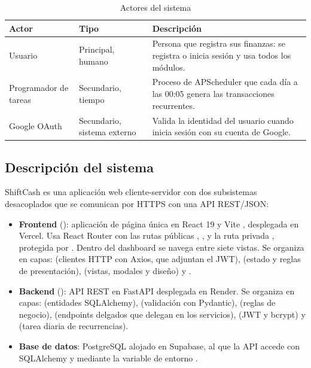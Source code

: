 \begin{table}[H]
\caption{Actores del sistema}
\label{tab:actores}
\begin{tabularx}{\linewidth}{L{3.6cm} L{2.2cm} Y}
\toprule
Actor & Tipo & Descripción \\
\midrule
Usuario & Principal, humano & Persona que registra sus finanzas: se registra o inicia sesión y usa todos los módulos. \\
Programador de tareas & Secundario, tiempo & Proceso de APScheduler que cada día a las 00:05 genera las transacciones recurrentes. \\
Google OAuth & Secundario, sistema externo & Valida la identidad del usuario cuando inicia sesión con su cuenta de Google. \\
\bottomrule
\end{tabularx}
\end{table}

\subsection{Descripción del sistema}\label{sec:descripcion}

ShiftCash es una aplicación web cliente-servidor con dos subsistemas desacoplados que se comunican por HTTPS con una API REST/JSON:

\begin{itemize}
  \item \textbf{Frontend} (): aplicación de página única en React 19 y Vite \parencite{react2025,vite2025}, desplegada en Vercel. Usa React Router con las rutas públicas \codigo{/}, ,  y la ruta privada , protegida por . Dentro del dashboard se navega entre siete vistas. Se organiza en capas:  (clientes HTTP con Axios, que adjuntan el JWT),  (estado y reglas de presentación),  (vistas, modales y diseño) y .
  \item \textbf{Backend} (): API REST en FastAPI \parencite{fastapi2025} desplegada en Render. Se organiza en capas:  (entidades SQLAlchemy),  (validación con Pydantic),  (reglas de negocio),  (endpoints delgados que delegan en los servicios),  (JWT y bcrypt) y  (tarea diaria de recurrencias).
  \item \textbf{Base de datos}: PostgreSQL alojado en Supabase, al que la API accede con SQLAlchemy y  mediante la variable de entorno .
\end{itemize}


